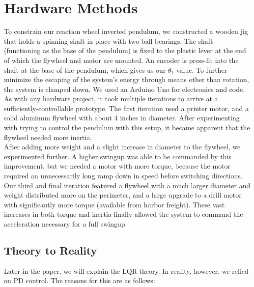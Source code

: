 \documentclass[conference]{IEEEtran}
\begin{document}
\section{Hardware Methods}
To constrain our reaction wheel inverted pendulum, we constructed a wooden jig that holds a spinning shaft in place with two ball bearings. The shaft (functioning as the base of the pendulum) is fixed to the plastic lever at the end of which the flywheel and motor are mounted. An encoder is press-fit into the shaft at the base of the pendulum, which gives us our $\theta_1$ value. To further minimize the escaping of the system's energy through means other than rotation, the system is clamped down. We used an Arduino Uno for electronics and code.\\ \indent
As with any hardware project, it took multiple iterations to arrive at a sufficiently-controllable prototype. The first iteration used a printer motor, and a solid aluminum flywheel with about 4 inches in diameter.  After experimenting with trying to control the pendulum with this setup, it became apparent that the flywheel needed more inertia. \\ \indent
After adding more weight and a slight increase in diameter to the flywheel, we experimented further. A higher swingup was able to be commanded by this improvement, but we needed a motor with more torque, because the motor required an unnecessarily long ramp down in speed before switching directions.\\ \indent 
Our third and final iteration featured a flywheel with a much larger diameter and weight distributed more on the perimeter, and a large upgrade to a drill motor with significantly more torque (available from harbor freight). These vast increases in both torque and inertia finally allowed the system to command the acceleration necessary for a full swingup.

\subsection{Theory to Reality}

Later in the paper, we will explain the LQR theory. In reality, however, we
relied on PD control. The reasons for this are as follows:
\end{document}
